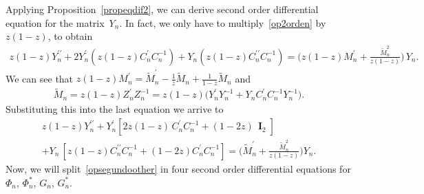 \documentclass[12pt]{amsart}
\newtheorem{corollary}{Corollary}[section]
\begin{document}
Applying Proposition~\ref{propeqdif2}, we can derive second order differential equation for the matrix~\(Y_n \). In fact, we only have to multiply~\eqref{op2orden} by \( z(1-z) \), to obtain
\begin{align*}
z(1-z)Y_n^{\prime\prime}+2Y_n^{\prime} ( z(1-z) C_n^{\prime}C_n^{-1} )+Y_n ( z(1-z) C_n^{\prime\prime} C_n^{-1}) =\Big( z(1-z) {M}_n^{\prime} + \frac{\widetilde{M}_n^2}{z(1-z)} \Big) \, Y_n.
\end{align*}
We can see that
\( \displaystyle z(1-z) {M}_n^{\prime} = \widetilde M_n^\prime - \frac{1}{z} \widetilde M_n + \frac{1}{1-z} \widetilde M_n \)
and
\begin{align*}
 \widetilde M_n = z(1-z) Z_n^\prime Z_n^{-1} =
 z(1-z) \big( Y_n^\prime Y_n^{-1} + Y_n C_n^\prime C_n^{-1} Y_n^{-1} \big).
\end{align*}
Substituting this into the last equation we arrive to
\begin{multline}
\label{opsegundoother}
 z(1-z)Y_n^{\prime\prime}+Y_n^\prime[2z(1-z) \, C_n^\prime C_n^{-1}+(1-2z) \, \mathbf{\operatorname I}_2 ]
 \\
+Y_n \, [z(1-z)C_n^{\prime\prime}C_n^{-1} +(1-2z)C_n^\prime C_n^{-1}] 
 =\Big(
 \widetilde{M}_n^{\prime}+\frac{\widetilde{M}_n^2}{z(1-z)}
 \Big)
 Y_n.
\end{multline}
Now, we will split~\eqref{opsegundoother} in four second order differential equations for \( \Phi_n\), \( \Phi_n^* \), \( G_n\), \( G_n^* \).
\end{document}
